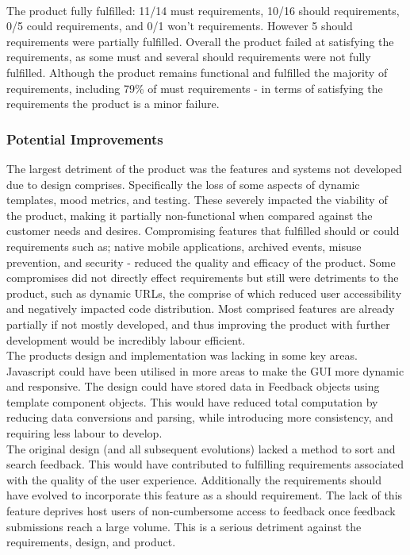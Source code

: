 \documentclass[9pt, titlepage]{extarticle}
\begin{document}
\\The product fully fulfilled: 11/14 must requirements, 10/16 should requirements, 0/5 could requirements, and 0/1 won't requirements. However 5 should requirements were partially fulfilled. Overall the product failed at satisfying the requirements, as some must and several should requirements were not fully fulfilled. Although the product remains functional and fulfilled the majority of requirements, including 79\% of must requirements - in terms of satisfying the requirements the product is a minor failure. 

\subsubsection{Potential Improvements}

The largest detriment of the product was the features and systems not developed due to design comprises. Specifically the loss of some aspects of dynamic templates, mood metrics, and testing. These severely impacted the viability of the product, making it partially non-functional when compared against the customer needs and desires. Compromising features that fulfilled should or could requirements such as; native mobile applications, archived events, misuse prevention, and security - reduced the quality and efficacy of the product. Some compromises did not directly effect requirements but still were detriments to the product, such as dynamic URLs, the comprise of which reduced user accessibility and negatively impacted code distribution. Most comprised features are already partially if not mostly developed, and thus improving the product with further development would be incredibly labour efficient.\\

The products design and implementation was lacking in some key areas. Javascript could have been utilised in more areas to make the GUI more dynamic and responsive. The design could have stored data in Feedback objects using template component objects. This would have reduced total computation by reducing data conversions and parsing, while introducing more consistency, and requiring less labour to develop.\\

The original design (and all subsequent evolutions) lacked a method to sort and search feedback. This would have contributed to fulfilling requirements associated with the quality of the user experience. Additionally the requirements should have evolved to incorporate this feature as a should requirement. The lack of this feature deprives host users of non-cumbersome access to feedback once feedback submissions reach a large volume. This is a serious detriment against the requirements, design, and product.\\
\end{document}
